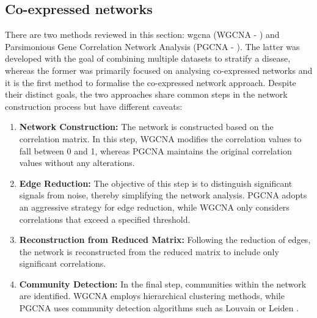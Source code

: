 \subsection{Co-expressed networks} \label{s:lit:co_net}

\vspace{3mm}
\vspace{3mm}

There are two methods reviewed in this section: \acrlong{wgcna} (WGCNA - \citet{Langfelder2008-sn}) and Parsimonious Gene Correlation Network Analysis (PGCNA - \citet{Care2019-ij}). The latter was developed with the goal of combining multiple datasets to stratify a disease, whereas the former was primarily focused on analysing co-expressed networks and it is the first method to formalise the co-expressed network approach. Despite their distinct goals, the two approaches share common steps in the network construction process but have different caveats:

\begin{enumerate}
    \item \textbf{Network Construction:} The network is constructed based on the correlation matrix. In this step, WGCNA modifies the correlation values to fall between 0 and 1, whereas PGCNA maintains the original correlation values without any alterations.
    
    \item \textbf{Edge Reduction:} The objective of this step is to distinguish significant signals from noise, thereby simplifying the network analysis. PGCNA adopts an aggressive strategy for edge reduction, while WGCNA only considers correlations that exceed a specified threshold.
    
    \item \textbf{Reconstruction from Reduced Matrix:} Following the reduction of edges, the network is reconstructed from the reduced matrix to include only significant correlations.
    
    \item \textbf{Community Detection:} In the final step, communities within the network are identified. WGCNA employs hierarchical clustering methods, while PGCNA uses community detection algorithms such as Louvain \citep{Blondel2008-ik} or Leiden \citep{Traag2019-ne}.
\end{enumerate}

